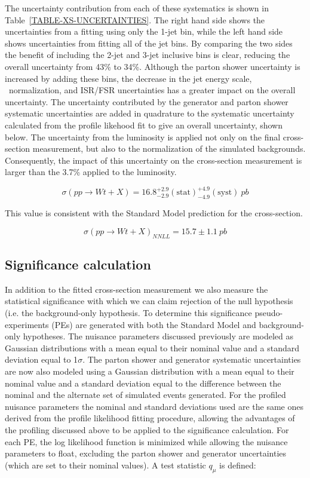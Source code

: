 The uncertainty contribution from each of these systematics is shown in Table~\ref{TABLE-XS-UNCERTAINTIES}. The right hand side shows the uncertainties from a fitting using only the 1-jet bin, while the left hand side shows uncertainties from fitting all of the jet bins. By comparing the two sides the benefit of including the 2-jet and 3-jet inclusive bins is clear, reducing the overall uncertainty from 43\% to 34\%. Although the parton shower uncertainty is increased by adding these bins, the decrease in the jet energy scale, \ttbar\ normalization, and ISR/FSR uncertainties has a greater impact on the overall uncertainty. The uncertainty contributed by the generator and parton shower systematic uncertainties are added in quadrature to the systematic uncertainty calculated from the profile likehood fit to give an overall uncertainty, shown below. The uncertainty from the luminosity is applied not only on the final cross-section measurement, but also to the normalization of the simulated backgrounds. Consequently, the impact of this uncertainty on the cross-section measurement is larger than the 3.7\% applied to the luminosity.

\begin{equation}
\sigma(pp\rightarrow Wt + X) = 16.8 ^{+2.9}_{-2.9} \mathrm{(stat)} ^{+4.9}_{-4.9} \mathrm{(syst)}~pb
\end{equation}

\noindent
This value is consistent with the Standard Model prediction for the cross-section.

\begin{equation}
\sigma(pp\rightarrow Wt + X)_{NNLL} = 15.7 \pm 1.1\ pb
\end{equation}

\subsection{Significance calculation}
In addition to the fitted cross-section measurement we also measure the statistical significance with which we can claim rejection of the null hypothesis (i.e. the background-only hypothesis. To determine this significance pseudo-experiments (PEs) are generated with both the Standard Model and background-only hypotheses. The nuisance parameters discussed previously are modeled as Gaussian distributions with a mean equal to their nominal value and a standard deviation equal to 1$\sigma$. The parton shower and generator systematic uncertainties are now also modeled using a Gaussian distribution with a mean equal to their nominal value and a standard deviation equal to the difference between the nominal and the alternate set of simulated events generated. For the profiled nuisance parameters the nominal and standard deviations used are the same ones derived from the profile likelihood fitting procedure, allowing the advantages of the profiling discussed above to be applied to the significance calculation. For each PE, the log likelihood function is minimized while allowing the nuisance parameters to float, excluding the parton shower and generator uncertainties (which are set to their nominal values). A test statistic $q_{\mu}$ is defined:

